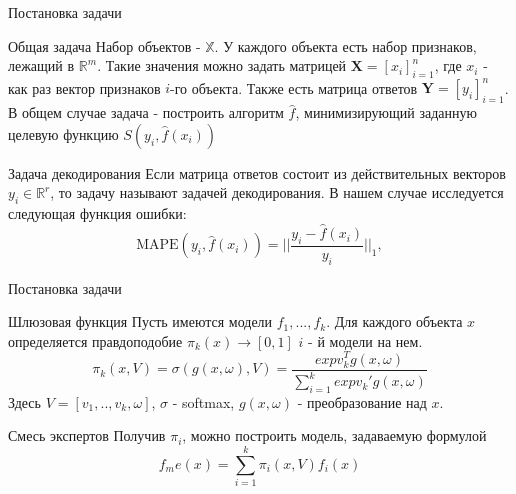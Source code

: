 \documentclass{beamer}
\begin{document}
\begin{frame}{Постановка задачи}
\begin{block}{Общая задача}
Набор объектов - $\mathbb{X}$.  У каждого объекта есть набор признаков,  лежащий в $\mathbb{R}^m$.  Такие значения можно задать матрицей 
$\mathbf{X} = [x_i]_{i = 1}^n$, где $x_i$ -  как раз вектор признаков $i$-го объекта. Также есть матрица ответов $\mathbf{Y} = [y_i]_{i = 1}^n$.  В общем случае задача - построить алгоритм $\hat{f}$, минимизирующий заданную целевую функцию $S(y_i, \hat{f}(x_i)) $
\end{block}


\begin{block}{Задача декодирования}
Если матрица ответов состоит из действительных векторов  $y_i \in \mathbb{R}^r$, то задачу называют задачей декодирования. В нашем случае исследуется следующая функция ошибки:
$$\text{MAPE}(y_i, \hat{f}(x_i)) = ||\frac{ y_i - \hat{f}(x_i)}{y_i} ||_1,$$
\end{block}

\end{frame}

\begin{frame}{Постановка задачи}


\begin{block}{Шлюзовая функция}
Пусть имеются модели $f_1, ..., f_k$.   Для каждого объекта $x$ определяется правдоподобие $\pi_k(x) \rightarrow [0, 1]$ $i$ - й модели на нем. 
$$ \pi_k(x, V) = \sigma(g(x, \omega), V) = \frac{exp v^T_k g(x, \omega)}{\sum\limits_{i = 1}^k exp v_k' g(x, \omega)}$$
Здесь  $V = [v_1, .., v_k, \omega]$, $\sigma$ - softmax, $g(x, \omega)$ - преобразование над $x$.
\end{block}


\begin{block}{Смесь экспертов}
Получив $\pi_i$, можно построить модель, задаваемую формулой 
$$ f_me(x) = \sum\limits_{i =1}^{k} \pi_i(x, V) f_i(x)$$
\end{block}

\end{frame}
\end{document}
